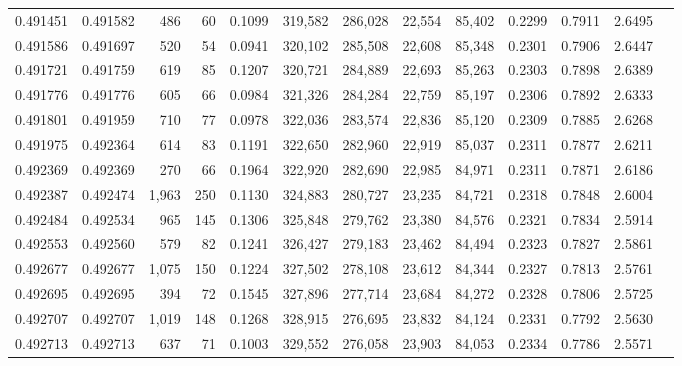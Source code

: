 \begin{tabular}{rrrrrrrrrrrrr}
0.491451 & 0.491582 &   486 &    60 &                                     0.1099 & 319,582 & 286,028 &  22,554 &  85,402 & 0.2299 & 0.7911 & 2.6495 \\
0.491586 & 0.491697 &   520 &    54 &                                     0.0941 & 320,102 & 285,508 &  22,608 &  85,348 & 0.2301 & 0.7906 & 2.6447 \\
0.491721 & 0.491759 &   619 &    85 &                                     0.1207 & 320,721 & 284,889 &  22,693 &  85,263 & 0.2303 & 0.7898 & 2.6389 \\
0.491776 & 0.491776 &   605 &    66 &                                     0.0984 & 321,326 & 284,284 &  22,759 &  85,197 & 0.2306 & 0.7892 & 2.6333 \\
0.491801 & 0.491959 &   710 &    77 &                                     0.0978 & 322,036 & 283,574 &  22,836 &  85,120 & 0.2309 & 0.7885 & 2.6268 \\
0.491975 & 0.492364 &   614 &    83 &                                     0.1191 & 322,650 & 282,960 &  22,919 &  85,037 & 0.2311 & 0.7877 & 2.6211 \\
0.492369 & 0.492369 &   270 &    66 &                                     0.1964 & 322,920 & 282,690 &  22,985 &  84,971 & 0.2311 & 0.7871 & 2.6186 \\
0.492387 & 0.492474 & 1,963 &   250 &                                     0.1130 & 324,883 & 280,727 &  23,235 &  84,721 & 0.2318 & 0.7848 & 2.6004 \\
0.492484 & 0.492534 &   965 &   145 &                                     0.1306 & 325,848 & 279,762 &  23,380 &  84,576 & 0.2321 & 0.7834 & 2.5914 \\
0.492553 & 0.492560 &   579 &    82 &                                     0.1241 & 326,427 & 279,183 &  23,462 &  84,494 & 0.2323 & 0.7827 & 2.5861 \\
0.492677 & 0.492677 & 1,075 &   150 &                                     0.1224 & 327,502 & 278,108 &  23,612 &  84,344 & 0.2327 & 0.7813 & 2.5761 \\
0.492695 & 0.492695 &   394 &    72 &                                     0.1545 & 327,896 & 277,714 &  23,684 &  84,272 & 0.2328 & 0.7806 & 2.5725 \\
0.492707 & 0.492707 & 1,019 &   148 &                                     0.1268 & 328,915 & 276,695 &  23,832 &  84,124 & 0.2331 & 0.7792 & 2.5630 \\
0.492713 & 0.492713 &   637 &    71 &                                     0.1003 & 329,552 & 276,058 &  23,903 &  84,053 & 0.2334 & 0.7786 & 2.5571 \\

\end{tabular}
